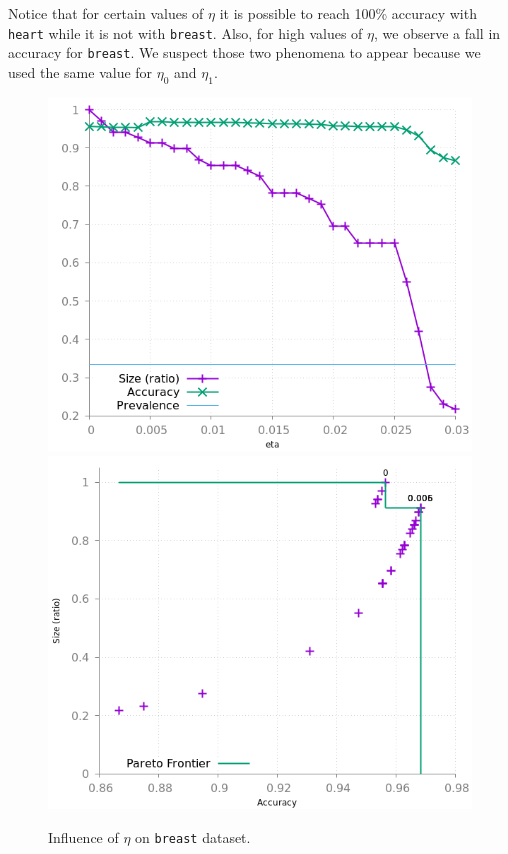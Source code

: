 \documentclass[preprint,12pt]{elsarticle}
\theoremstyle{definition}
\begin{document}
Notice that for certain values of $\eta$ it is possible to reach 100\% accuracy with \texttt{heart} while it is not with \texttt{breast}. Also, for high values of $\eta$, we observe a fall in accuracy for \texttt{breast}. We suspect those two phenomena to appear because we used the same value for $\eta_0$ and $\eta_1$. 

\begin{figure}[!h]\centering
\includegraphics[scale=0.3]{img/meta_breast.png}
\hfill
\includegraphics[scale=0.3]{img/meta_pareto_breast.png}
\caption{Influence of $\eta$ on \texttt{breast} dataset.}
\label{fig:meta_breast}
\end{figure}
\end{document}

